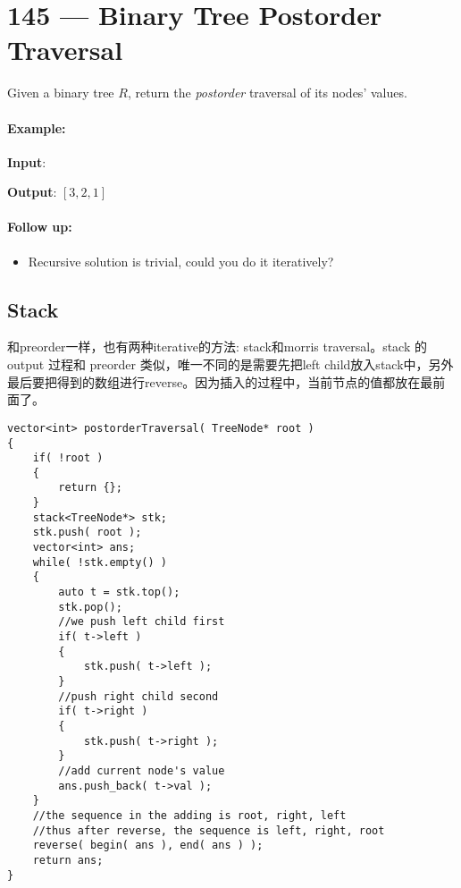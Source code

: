 \section{145 --- Binary Tree Postorder Traversal}
Given a binary tree $R$, return the \textit{postorder} traversal of its nodes' values.
\paragraph{Example:}
\begin{flushleft}
\textbf{Input}:
\begin{figure}[H]
\end{figure}
\textbf{Output}: $[3,2,1]$
\end{flushleft}
\paragraph{Follow up:}
\begin{itemize}
\item Recursive solution is trivial, could you do it iteratively?
\end{itemize}
\subsection{Stack}
和preorder一样，也有两种iterative的方法: stack和morris traversal。stack 的 output 过程和 preorder 类似，唯一不同的是需要先把left child放入stack中，另外最后要把得到的数组进行reverse。因为插入的过程中，当前节点的值都放在最前面了。

\setcounter{lstlisting}{0}
\begin{lstlisting}[style=customc, caption={Iteraive Apporach 1}]
vector<int> postorderTraversal( TreeNode* root )
{
    if( !root )
    {
        return {};
    }
    stack<TreeNode*> stk;
    stk.push( root );
    vector<int> ans;
    while( !stk.empty() )
    {
        auto t = stk.top();
        stk.pop();
        //we push left child first
        if( t->left )
        {
            stk.push( t->left );
        }
        //push right child second
        if( t->right )
        {
            stk.push( t->right );
        }
        //add current node's value
        ans.push_back( t->val );
    }
    //the sequence in the adding is root, right, left
    //thus after reverse, the sequence is left, right, root
    reverse( begin( ans ), end( ans ) );
    return ans;
}
\end{lstlisting}

